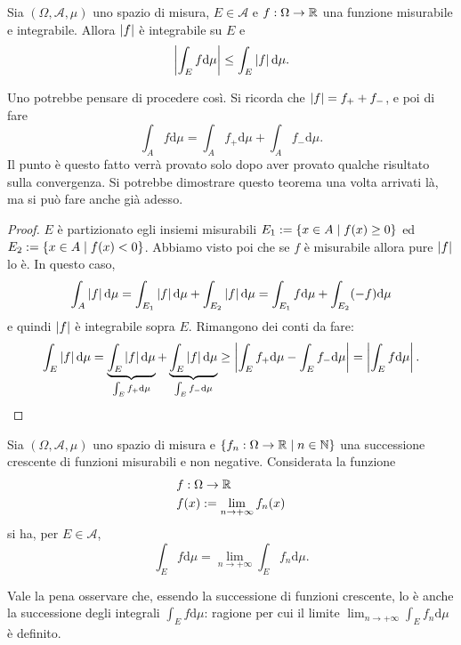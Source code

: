 \begin{proposizione}
Sia \((\Omega, \mathcal A, \mu)\) uno spazio di misura, \(E \in \mathcal A\) e \(f : \Omega \to \mathbb R\) una funzione misurabile e integrabile. Allora \(\left\lvert f\right\rvert\) è integrabile su \(E\) e
\[\left\lvert\int_E f \mathrm d \mu\right\rvert \le \int_E \left\lvert f\right\rvert \mathrm d \mu .\]
\end{proposizione}

Uno potrebbe pensare di procedere così. Si ricorda che \(\left\lvert f\right\rvert = f_+ + f_-\), e poi di fare
\[\int_A f \mathrm d \mu = \int_A f_+ \mathrm d \mu + \int_A f_- \mathrm d \mu .\]
Il punto è questo fatto verrà provato solo dopo aver provato qualche risultato sulla convergenza. Si potrebbe dimostrare questo teorema una volta arrivati là, ma si può fare anche già adesso.

\begin{proof}
\(E\) è partizionato egli insiemi misurabili \(E_1 := \left\{x \in A \mid f(x) \ge 0\right\}\) ed \(E_2 := \left\{x \in A \mid f(x) < 0\right\}\). Abbiamo visto poi che se \(f\) è misurabile allora pure \(\left\lvert f\right\rvert\) lo è. In questo caso,
\[\int_A \left\lvert f\right\rvert \mathrm d \mu = \int_{E_1} \left\lvert f\right\rvert \mathrm d \mu + \int_{E_2} \left\lvert f\right\rvert \mathrm d \mu = \int_{E_1} f \mathrm d \mu + \int_{E_2} (-f) \mathrm d \mu\]
e quindi \(\left\lvert f\right\rvert\) è integrabile sopra \(E\). Rimangono dei conti da fare:
\[\int_E \left\lvert f\right\rvert \mathrm d \mu = \underbrace{\int_E \left\lvert f\right\rvert \mathrm d \mu}_{\int_E f_+ \mathrm d \mu} + \underbrace{\int_E \left\lvert f\right\rvert \mathrm d \mu}_{\int_E f_- \mathrm d \mu} \ge \left\lvert\int_E f_+ \mathrm d \mu - \int_E f_- \mathrm d \mu\right\rvert = \left\lvert\int_E f \mathrm d \mu\right\rvert .\qedhere\]
\end{proof}

\begin{proposizione}\label{proposizione:BeppoLevi}
Sia \((\Omega, \mathcal A, \mu)\) uno spazio di misura e \(\left\{f_n : \Omega \to \mathbb R \mid n \in \mathbb N\right\}\) una successione crescente di funzioni misurabili e non negative. Considerata la funzione
\begin{align*}
& f : \Omega \to \mathbb R \\
& f(x) := \lim_{n \to +\infty} f_n(x)
\end{align*}
si ha, per \(E \in \mathcal A\),
\[\int_E f \mathrm d \mu = \lim_{n \to +\infty} \int_E f_n \mathrm d \mu .\]
\end{proposizione}

Vale la pena osservare che, essendo la successione di funzioni crescente, lo è anche la successione degli integrali \(\int_E f \mathrm d \mu\): ragione per cui il limite \(\lim_{n \to +\infty} \int_E f_n \mathrm d \mu\) è definito.

